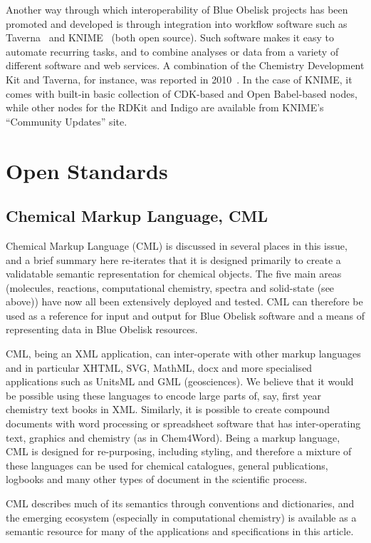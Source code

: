 \documentclass[10pt]{bmc_article}
\newenvironment{bmcformat}{\fussy\setboolean{publ}{true}}{\fussy}
\begin{document}
\begin{bmcformat}
Another way through which interoperability of Blue Obelisk projects
has been promoted and developed is through integration into
workflow software such as Taverna~\cite{Hull:2006p60} and
KNIME~\cite{WebKNIME} (both open source).
Such software makes it easy to automate recurring
tasks, and to combine analyses or data from a variety of different software
and web services.
A combination of the Chemistry Development Kit and Taverna, for instance, was
reported in 2010~\cite{Kuhn:2010p4001}. 
In the case of KNIME, it comes with built-in basic collection of CDK-based and
Open Babel-based nodes, while other nodes for the RDKit and Indigo are
available from KNIME's ``Community Updates'' site.


\section*{Open Standards}

\subsection*{Chemical Markup Language, CML}

Chemical Markup Language (CML) is discussed in several places in this
issue, and a brief summary here re-iterates that it is designed
primarily to create a validatable semantic representation for chemical
objects. The five main areas (molecules, reactions, computational
chemistry, spectra and solid-state (see above)) have now all been
extensively deployed and tested. CML can therefore be used as a
reference for input and output for Blue Obelisk software and a means
of representing data in Blue Obelisk resources.

CML, being an XML application, can inter-operate with other markup
languages and in particular XHTML, SVG, MathML, docx and more
specialised applications such as UnitsML and GML (geosciences). We
believe that it would be possible using these languages to encode
large parts of, say, first year chemistry text books in XML.
Similarly, it is possible to create compound documents with word
processing or spreadsheet software that has inter-operating text,
graphics and chemistry (as in Chem4Word). Being a markup language, CML
is designed for re-purposing, including styling, and therefore a
mixture of these languages can be used for chemical catalogues,
general publications, logbooks and many other types of document in the
scientific process.

CML describes much of its semantics through conventions and
dictionaries, and the emerging ecosystem (especially in computational
chemistry) is available as a semantic resource for many of the
applications and specifications in this article.



\end{bmcformat}
\end{document}
